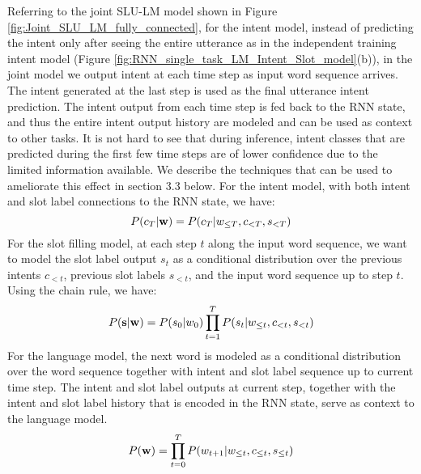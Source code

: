 \documentclass[11pt]{article}
\begin{document}
    Referring to the joint SLU-LM model shown in Figure \ref{fig:Joint_SLU_LM_fully_connected}, for the intent model, instead of predicting the intent only after seeing the entire utterance as in the independent training intent model (Figure \ref{fig:RNN_single_task_LM_Intent_Slot_model}(b)), in the joint model we output intent at each time step as input word sequence arrives. The intent generated at the last step is used as the final utterance intent prediction. The intent output from each time step is fed back to the RNN state, and thus the entire intent output history are modeled and can be used as context to other tasks. It is not hard to see that during inference, intent classes that are predicted during the first few time steps are of lower confidence due to the limited information available. We describe the techniques that can be used to ameliorate this effect in section 3.3 below. For the intent model, with both intent and slot label connections to the RNN state, we have:
        \begin{equation}
            P(c_{T}|\mathbf{w}) = P(c_T|w_{\leq T}, c_{<T}, s_{<T}) \\
        \end{equation}
    For the slot filling model, at each step $t$ along the input word sequence, we want to model the slot label output $s_t$ as a conditional distribution over the previous intents $c_{<t}$, previous slot labels $s_{<t}$, and the input word sequence up to step $t$. Using the chain rule, we have:
        \begin{equation}
            P(\mathbf{s}|\mathbf{w}) = P(s_0|w_0)\prod_{t=1}^{T} P(s_t|w_{\leq t}, c_{<t}, s_{<t}) \\
        \end{equation}
    For the language model, the next word is modeled as a conditional distribution over the word sequence together with intent and slot label sequence up to current time step. The intent and slot label outputs at current step, together with the intent and slot label history that is encoded in the RNN state, serve as context to the language model. 
        \begin{equation}
            P(\mathbf{w}) = \prod_{t=0}^{T} P(w_{t+1}|w_{\leq t}, c_{\leq t}, s_{\leq t}) \\
        \end{equation}
\end{document}
